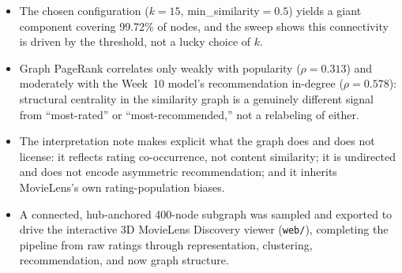 \documentclass[12pt,a4paper]{article}
\begin{document}
\begin{itemize}[nosep]
  \item The chosen configuration ($k=15$, min\_similarity$=0.5$) yields a giant component covering
    99.72\% of nodes, and the sweep shows this connectivity is driven by the threshold, not a
    lucky choice of $k$.
  \item Graph PageRank correlates only weakly with popularity ($\rho=0.313$) and moderately with
    the Week~10 model's recommendation in-degree ($\rho=0.578$): structural centrality in the
    similarity graph is a genuinely different signal from ``most-rated'' or ``most-recommended,''
    not a relabeling of either.
  \item The interpretation note makes explicit what the graph does and does not license: it
    reflects rating co-occurrence, not content similarity; it is undirected and does not encode
    asymmetric recommendation; and it inherits MovieLens's own rating-population biases.
  \item A connected, hub-anchored 400-node subgraph was sampled and exported to drive the
    interactive 3D MovieLens Discovery viewer (\texttt{web/}), completing the pipeline from raw
    ratings through representation, clustering, recommendation, and now graph structure.
\end{itemize}
\end{document}
